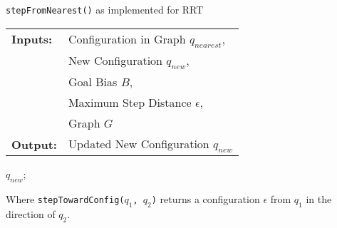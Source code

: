 \bigskip
\begin{algorithm}[H]
    \caption{\texttt{stepFromNearest()} as implemented for \gls{RRT}}
    \SetAlgoLined
    \begin{tabular}{l l}
    \textbf{Inputs:}    & Configuration in Graph $q_{nearest}$,\\ 
                        & New Configuration $q_{new}$, \\
                        & Goal Bias $B$, \\
                        & Maximum Step Distance $\epsilon$, \\
                        & Graph $G$ \\
    \textbf{Output:}    & Updated New Configuration $q_{new}$ \\
    \end{tabular}

        \Return $q_{new}$;\\
\end{algorithm}
\bigskip
Where \texttt{stepTowardConfig($q_1$, $q_2$)} returns a configuration $\epsilon$ from $q_1$ in the direction of $q_2$.

